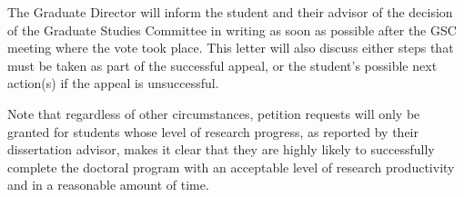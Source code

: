 The Graduate Director will inform the student and their advisor of the
decision of the Graduate Studies Committee in writing as soon as
possible after the GSC meeting where the vote took place.  This letter
will also discuss either steps that must be taken as part of the
successful appeal, or the student’s possible next action(s) if the
appeal is unsuccessful.

Note that regardless of other circumstances, petition requests will
only be granted for students whose level of research progress, as
reported by their dissertation advisor, makes it clear that they are
highly likely to successfully complete the doctoral program with an
acceptable level of research productivity and in a reasonable amount
of time.
